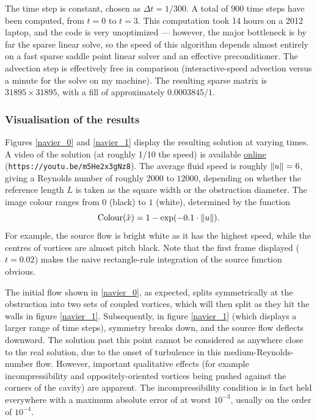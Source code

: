 The time step is constant, chosen as $\Delta t = 1/300$. A total of $900$ time steps have been computed, from $t = 0$ to $t = 3$.
This computation took 14 hours on a 2012 laptop, and the code is very unoptimized --- however, the major bottleneck is by far the sparse linear solve,
so the speed of this algorithm depends almost entirely on a fast sparse saddle point linear solver and an effective preconditioner. The
advection step is effectively free in comparison (interactive-speed advection versus a minute for the solve on my machine). The resulting sparse matrix is $31895 \times 31895$, with a
fill of approximately $0.0003845/1$.

\subsubsection{Visualisation of the results}
Figures \ref{navier_0} and \ref{navier_1} display the resulting solution at varying times. A video of the solution (at roughly 1/10 the speed) is
available \href{https://youtu.be/m5He2x3gNz8}{online} (\texttt{https://youtu.be/m5He2x3gNz8}).
The average fluid speed is roughly $\norm{u} = 6$, giving a Reynolds number of roughly $2000$ to $12000$,
depending on whether the reference length $L$ is taken as the square width or the obstruction diameter. The image colour ranges from $0$ (black) to $1$ (white),
determined by the function
    $$\text{Colour}(\hat{x}) = 1-\exp(-0.1\cdot \norm{u}).$$
For example, the source flow is bright white as it has the highest speed, while the centres of vortices are almost pitch black.
Note that the first frame displayed ($t = 0.02$) makes the naive rectangle-rule integration of the source function obvious.

The initial flow shown in \ref{navier_0}, as expected, splits symmetrically at the obstruction into two sets of coupled vortices, which will then split as they hit the walls in figure \ref{navier_1}.
Subsequently, in figure \ref{navier_1} (which displays a larger range of time steps), symmetry breaks down, and the source flow deflects downward.
The solution past this point cannot be considered as anywhere close to the real solution, due to the onset of turbulence in this medium-Reynolds-number flow. However, important qualitative effects
(for example incompressibility and oppositely-oriented vortices being pushed against the corners of the cavity) are apparent. The incompressibility condition is
in fact held everywhere with a maximum absolute error of at worst $10^{-3}$, usually on the order of $10^{-4}$.

